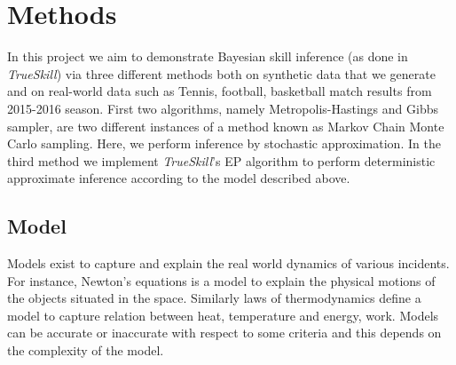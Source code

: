 \documentclass[12pt]{article}
\begin{document}
\section{Methods}
In this project we aim to demonstrate Bayesian skill inference (as done in \textit{TrueSkill}) via three different methods both on synthetic data that we generate and on real-world data such as Tennis, football, basketball match results from 2015-2016 season. First two algorithms, namely Metropolis-Hastings and Gibbs sampler, are two different instances of a method known as Markov Chain Monte Carlo sampling. Here, we perform inference by stochastic approximation. In the third method we implement \textit{TrueSkill}'s EP algorithm \cite{minka2001ep} to perform deterministic approximate inference according to the model described above.

\subsection{Model}
Models exist to capture and explain the real world dynamics of various incidents. For instance, Newton's equations is a model to explain the physical motions of the objects situated in the space. Similarly laws of thermodynamics define a model to capture relation between heat, temperature and energy, work. Models can be accurate or inaccurate with respect to some criteria and this depends on the complexity of the model. 
\end{document}
